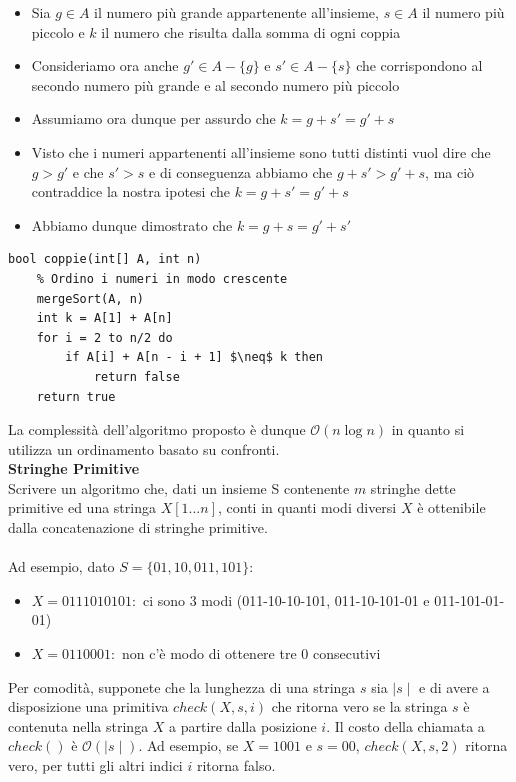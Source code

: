 \documentclass[../cheatSheetAlgoritmi.tex]{subfiles}
\begin{document}
\begin{itemize}
	\item Sia $g \in A$ il numero più grande appartenente all'insieme, $s \in A$ il numero più piccolo e $k$ il numero che risulta dalla somma di ogni coppia
	\item Consideriamo ora anche $g' \in A - \{g\}$ e $s' \in A - \{s\}$ che corrispondono al secondo numero più grande e al secondo numero più piccolo
	\item Assumiamo ora dunque per assurdo che $k = g + s' = g' + s$
	\item Visto che i numeri appartenenti all'insieme sono tutti distinti vuol dire che $g > g'$ e che $s' > s$ e di conseguenza abbiamo che $g + s' > g' + s$, ma ciò contraddice la nostra ipotesi che $k = g + s' = g' + s$
	\item Abbiamo dunque dimostrato che $k = g + s = g' + s'$ 
\end{itemize}
\begin{lstlisting}[caption=2-partition (Coppie)]
bool coppie(int[] A, int n)
	% Ordino i numeri in modo crescente
	mergeSort(A, n)
	int k = A[1] + A[n]
	for i = 2 to n/2 do
		if A[i] + A[n - i + 1] $\neq$ k then
			return false
	return true
\end{lstlisting}
La complessità dell'algoritmo proposto è dunque $\mathcal{O}(n \log n)$ in quanto si utilizza un ordinamento basato su confronti.\\
\textbf{Stringhe Primitive}\\
Scrivere un algoritmo che, dati un insieme S contenente $m$ stringhe dette primitive ed una stringa $X[1. . . n]$, conti in quanti modi diversi $X$ è ottenibile dalla concatenazione di stringhe primitive. \\\\
Ad esempio, dato $S=\{01,10,011,101\}$:
\begin{itemize}
	\item $X = 0111010101: $ ci sono 3 modi
(011-10-10-101, 011-10-101-01 e 011-101-01-01)
	\item $X = 0110001:$ non c’è modo di ottenere tre $0$ consecutivi
\end{itemize}
Per comodità, supponete che la lunghezza di una stringa $s$ sia $\mid s \mid$ e di avere a disposizione una primitiva $check(X, s, i)$ che ritorna vero se la stringa $s$ è contenuta nella stringa $X$ a partire dalla posizione $i$. Il costo della chiamata a $check()$ è $\mathcal{O}(\mid s \mid)$. Ad esempio, se $X=1001$ e $s=00$, $check(X, s,2)$ ritorna vero, per tutti gli altri indici $i$ ritorna falso.
\end{document}
